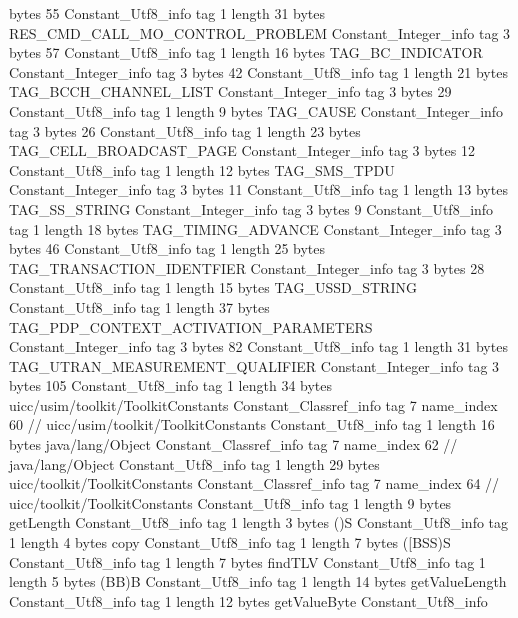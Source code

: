 {{{			bytes	55
		}
		Constant_Utf8_info {
			tag	1
			length	31
			bytes	RES_CMD_CALL_MO_CONTROL_PROBLEM
		}
		Constant_Integer_info {
			tag	3
			bytes	57
		}
		Constant_Utf8_info {
			tag	1
			length	16
			bytes	TAG_BC_INDICATOR
		}
		Constant_Integer_info {
			tag	3
			bytes	42
		}
		Constant_Utf8_info {
			tag	1
			length	21
			bytes	TAG_BCCH_CHANNEL_LIST
		}
		Constant_Integer_info {
			tag	3
			bytes	29
		}
		Constant_Utf8_info {
			tag	1
			length	9
			bytes	TAG_CAUSE
		}
		Constant_Integer_info {
			tag	3
			bytes	26
		}
		Constant_Utf8_info {
			tag	1
			length	23
			bytes	TAG_CELL_BROADCAST_PAGE
		}
		Constant_Integer_info {
			tag	3
			bytes	12
		}
		Constant_Utf8_info {
			tag	1
			length	12
			bytes	TAG_SMS_TPDU
		}
		Constant_Integer_info {
			tag	3
			bytes	11
		}
		Constant_Utf8_info {
			tag	1
			length	13
			bytes	TAG_SS_STRING
		}
		Constant_Integer_info {
			tag	3
			bytes	9
		}
		Constant_Utf8_info {
			tag	1
			length	18
			bytes	TAG_TIMING_ADVANCE
		}
		Constant_Integer_info {
			tag	3
			bytes	46
		}
		Constant_Utf8_info {
			tag	1
			length	25
			bytes	TAG_TRANSACTION_IDENTFIER
		}
		Constant_Integer_info {
			tag	3
			bytes	28
		}
		Constant_Utf8_info {
			tag	1
			length	15
			bytes	TAG_USSD_STRING
		}
		Constant_Utf8_info {
			tag	1
			length	37
			bytes	TAG_PDP_CONTEXT_ACTIVATION_PARAMETERS
		}
		Constant_Integer_info {
			tag	3
			bytes	82
		}
		Constant_Utf8_info {
			tag	1
			length	31
			bytes	TAG_UTRAN_MEASUREMENT_QUALIFIER
		}
		Constant_Integer_info {
			tag	3
			bytes	105
		}
		Constant_Utf8_info {
			tag	1
			length	34
			bytes	uicc/usim/toolkit/ToolkitConstants
		}
		Constant_Classref_info {
			tag	7
			name_index	60		// uicc/usim/toolkit/ToolkitConstants
		}
		Constant_Utf8_info {
			tag	1
			length	16
			bytes	java/lang/Object
		}
		Constant_Classref_info {
			tag	7
			name_index	62		// java/lang/Object
		}
		Constant_Utf8_info {
			tag	1
			length	29
			bytes	uicc/toolkit/ToolkitConstants
		}
		Constant_Classref_info {
			tag	7
			name_index	64		// uicc/toolkit/ToolkitConstants
		}
		Constant_Utf8_info {
			tag	1
			length	9
			bytes	getLength
		}
		Constant_Utf8_info {
			tag	1
			length	3
			bytes	()S
		}
		Constant_Utf8_info {
			tag	1
			length	4
			bytes	copy
		}
		Constant_Utf8_info {
			tag	1
			length	7
			bytes	([BSS)S
		}
		Constant_Utf8_info {
			tag	1
			length	7
			bytes	findTLV
		}
		Constant_Utf8_info {
			tag	1
			length	5
			bytes	(BB)B
		}
		Constant_Utf8_info {
			tag	1
			length	14
			bytes	getValueLength
		}
		Constant_Utf8_info {
			tag	1
			length	12
			bytes	getValueByte
		}
		Constant_Utf8_info {
}}}
